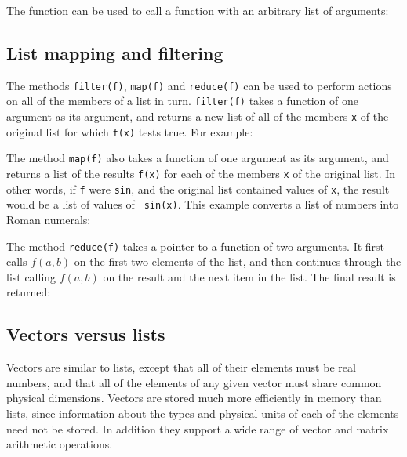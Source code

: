 The  function can be used to call a function with an
arbitrary list of arguments:

\vspace{3mm}

\vspace{3mm}

\subsection{List mapping and filtering}
\label{sec:listfilter}

The methods {\tt filter(f)}, {\tt map(f)} and {\tt reduce(f)} can be used to
perform actions on all of the members of a list in turn. {\tt filter(f)} takes
a function of one argument as its argument, and returns a new list of all of
the members {\tt x} of the original list for which {\tt f(x)} tests true. For
example:

\vspace{3mm}

\vspace{3mm}

The method {\tt map(f)} also takes a function of one argument as its argument,
and returns a list of the results {\tt f(x)} for each of the members {\tt x} of
the original list. In other words, if {\tt f} were {\tt sin}, and the original
list contained values of {\tt x}, the result would be a list of values of {\tt
sin(x)}. This example converts a list of numbers into Roman numerals:

\vspace{3mm}

\vspace{3mm}

The method {\tt reduce(f)} takes a pointer to a function of two arguments. It
first calls $f(a,b)$ on the first two elements of the list, and then continues
through the list calling $f(a,b)$ on the result and the next item in the list.
The final result is returned:

\vspace{3mm}

\vspace{3mm}


\subsection{Vectors versus lists}

Vectors are similar to lists, except that all of their elements must be real
numbers, and that all of the elements of any given vector must share common
physical dimensions.  Vectors are stored much more efficiently in memory than
lists, since information about the types and physical units of each of the
elements need not be stored. In addition they support a wide range of vector
and matrix arithmetic operations.

